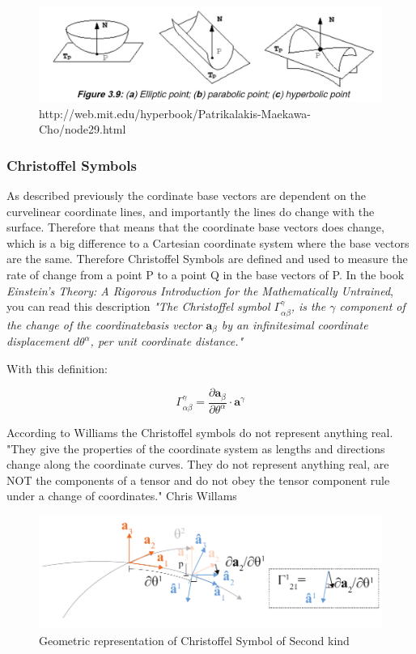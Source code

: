 \begin{figure}[H]
\centering
\includegraphics[width = 1\linewidth ]{figure/Theory/SecondFF2.JPG}
\caption{http://web.mit.edu/hyperbook/Patrikalakis-Maekawa-Cho/node29.html}
\end{figure}

\subsubsection{Christoffel Symbols}

As described previously the cordinate base vectors are dependent on the curvelinear coordinate lines, and importantly the lines do change with the surface. Therefore that means that the coordinate base vectors does change, which is a big difference to a Cartesian coordinate system where the base vectors are the same. Therefore Christoffel Symbols are defined and used to measure the rate of change from a point P to a point Q in the base vectors of P.
In the book  \textit{Einstein's Theory: A Rigorous Introduction for the Mathematically Untrained}, you can read this description \textit{ "The Christoffel symbol $\Gamma^\gamma_{\alpha \beta}$, is the $\gamma$ component of the change of the coordinatebasis vector $ \textbf{a}_\beta $ by an infinitesimal coordinate displacement $ d\theta^\alpha $, per unit coordinate
distance."} \cite{ref:Einstein}

With this definition:

\begin{equation}
\Gamma^\gamma_{\alpha \beta} = \frac{\partial\textbf{a}_\beta}{\partial\theta^\alpha}\cdot \textbf{a}^\gamma
\end{equation}


According to Williams the Christoffel symbols do not represent anything real.  
"They give the properties of the coordinate system as lengths and directions change along the coordinate curves. They do not represent anything real, are NOT the components of a tensor and do not obey the tensor component rule under a change of coordinates." Chris Willams

\begin{figure}[H]
\centering
\includegraphics[width=0.9\linewidth ]{figure/Theory/christoffelSecondKind.pdf}
\caption{ Geometric representation of Christoffel Symbol of Second kind }
\end{figure}

